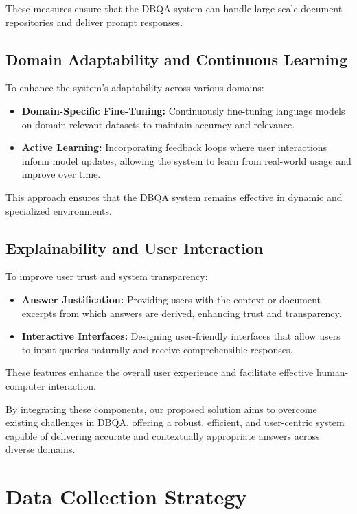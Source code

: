 \documentclass[sigconf]{acmart}
\begin{document}
These measures ensure that the DBQA system can handle large-scale document repositories and deliver prompt responses.

\subsection{Domain Adaptability and Continuous Learning}

To enhance the system's adaptability across various domains:

\begin{itemize}
    \item \textbf{Domain-Specific Fine-Tuning:} Continuously fine-tuning language models on domain-relevant datasets to maintain accuracy and relevance.
    \item \textbf{Active Learning:} Incorporating feedback loops where user interactions inform model updates, allowing the system to learn from real-world usage and improve over time.
\end{itemize}

This approach ensures that the DBQA system remains effective in dynamic and specialized environments.

\subsection{Explainability and User Interaction}

To improve user trust and system transparency:

\begin{itemize}
    \item \textbf{Answer Justification:} Providing users with the context or document excerpts from which answers are derived, enhancing trust and transparency.
    \item \textbf{Interactive Interfaces:} Designing user-friendly interfaces that allow users to input queries naturally and receive comprehensible responses.
\end{itemize}

These features enhance the overall user experience and facilitate effective human-computer interaction.

By integrating these components, our proposed solution aims to overcome existing challenges in DBQA, offering a robust, efficient, and user-centric system capable of delivering accurate and contextually appropriate answers across diverse domains.


\section{Data Collection Strategy}
\end{document}
